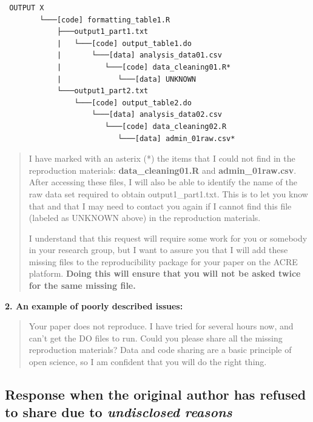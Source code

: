 \documentclass[]{book}
\begin{document}
\begin{verbatim}
 OUTPUT X
        └───[code] formatting_table1.R
            ├───output1_part1.txt  
            |   └───[code] output_table1.do           
            |       └───[data] analysis_data01.csv
            |          └───[code] data_cleaning01.R*
            |             └───[data] UNKNOWN
            └───output1_part2.txt  
                └───[code] output_table2.do           
                    └───[data] analysis_data02.csv
                       └───[code] data_cleaning02.R
                          └───[data] admin_01raw.csv* 
\end{verbatim}

\begin{quote}
I have marked with an asterix (*) the items that I could not find in the reproduction materials: \textbf{data\_cleaning01.R} and \textbf{admin\_01raw.csv}. After accessing these files, I will also be able to identify the name of the raw data set required to obtain output1\_part1.txt. This is to let you know that and that I may need to contact you again if I cannot find this file (labeled as UNKNOWN above) in the reproduction materials.

I understand that this request will require some work for you or somebody in your research group, but I want to assure you that I will add these missing files to the reproducibility package for your paper on the ACRE platform. \textbf{Doing this will ensure that you will not be asked twice for the same missing file.}
\end{quote}

\textbf{2. An example of poorly described issues:}

\begin{quote}
Your paper does not reproduce. I have tried for several hours now, and can't get the DO files to run. Could you please share all the missing reproduction materials? Data and code sharing are a basic principle of open science, so I am confident that you will do the right thing.
\end{quote}

\hypertarget{response-when-the-original-author-has-refused-to-share-due-to-undisclosed-reasons}{%
\subsection{\texorpdfstring{Response when the original author has refused to share due to \emph{undisclosed reasons}}{Response when the original author has refused to share due to undisclosed reasons}}\label{response-when-the-original-author-has-refused-to-share-due-to-undisclosed-reasons}}
\end{document}
